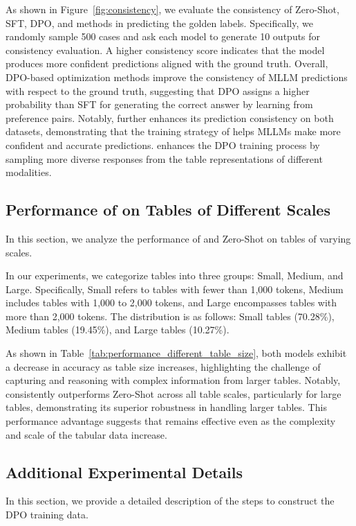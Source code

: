 As shown in Figure~\ref{fig:consistency}, we evaluate the consistency of Zero-Shot, SFT, DPO, and \method{} methods in predicting the golden labels. Specifically, we randomly sample 500 cases and ask each model to generate 10 outputs for consistency evaluation. A higher consistency score indicates that the model produces more confident predictions aligned with the ground truth. Overall, DPO-based optimization methods improve the consistency of MLLM predictions with respect to the ground truth, suggesting that DPO assigns a higher probability than SFT for generating the correct answer by learning from preference pairs. Notably, \method{} further enhances its prediction consistency on both datasets, demonstrating that the training strategy of \method{} helps MLLMs make more confident and accurate predictions. \method{} enhances the DPO training process by sampling more diverse responses from the table representations of different modalities.





\subsection{Performance of \method{} on Tables of Different Scales}
In this section, we analyze the performance of \method{} and Zero-Shot on tables of varying scales.

In our experiments, we categorize tables into three groups: Small, Medium, and Large. Specifically, Small refers to tables with fewer than 1,000 tokens, Medium includes tables with 1,000 to 2,000 tokens, and Large encompasses tables with more than 2,000 tokens. The distribution is as follows: Small tables (70.28\%), Medium tables (19.45\%), and Large tables (10.27\%).

As shown in Table~\ref{tab:performance_different_table_size}, both models exhibit a decrease in accuracy as table size increases, highlighting the challenge of capturing and reasoning with complex information from larger tables. Notably, \method{} consistently outperforms Zero-Shot across all table scales, particularly for large tables, demonstrating its superior robustness in handling larger tables. This performance advantage suggests that \method{} remains effective even as the complexity and scale of the tabular data increase.

\subsection{Additional Experimental Details}\label{app:experiments}
In this section, we provide a detailed description of the steps to construct the DPO training data.

